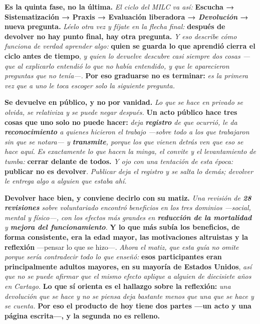\documentclass[11pt,letterpaper]{article}
\newcommand{\milcpaso}[3]{%
\Needspace{4\baselineskip}%
\begin{tcolorbox}[enhanced,colback=white,colframe=milcLinea,arc=1.5mm,boxrule=.9pt,
  left=14mm,right=4mm,top=3mm,bottom=3mm,before skip=4pt,after skip=4pt,
  fontupper=\RaggedRight,
  overlay={\node[anchor=north west,circle,fill=#2,text=white,inner sep=0pt,
    minimum size=7.4mm,font=\sffamily\bfseries\small]
    at ([xshift=3.6mm,yshift=-3.2mm]frame.north west) {#1};}]
#3
\end{tcolorbox}}
\begin{document}
\milcpaso{1}{milcTurquesa}{\textbf{Es la quinta fase, no la última.} \emph{El ciclo del MILC va así:} \textbf{Escucha → Sistematización → Praxis → Evaluación liberadora → \emph{Devolución} → nueva pregunta.} \emph{Léelo otra vez y fíjate en la flecha final:} \textbf{después de devolver no hay punto final, hay otra pregunta.} \emph{Y eso describe cómo funciona de verdad aprender algo:} \textbf{quien se guarda lo que aprendió cierra el ciclo antes de tiempo}, \emph{y quien lo devuelve descubre casi siempre dos cosas ---que al explicarlo entendió lo que no había entendido, y que le aparecieron preguntas que no tenía---.} \textbf{Por eso graduarse no es terminar:} \emph{es la primera vez que a uno le toca escoger solo la siguiente pregunta.}}
\milcpaso{2}{milcTurquesa}{\textbf{Se devuelve en público, y no por vanidad.} \emph{Lo que se hace en privado se olvida, se relativiza y se puede negar después.} \textbf{Un acto público hace tres cosas que uno solo no puede hacer:} \emph{deja \textbf{registro} de que ocurrió, le da \textbf{reconocimiento} a quienes hicieron el trabajo ---sobre todo a los que trabajaron sin que se notara--- y \textbf{transmite}, porque los que vienen detrás ven que eso se hace aquí}. \emph{Es exactamente lo que hacen la minga, el convite y el levantamiento de tumba:} \textbf{cerrar delante de todos.} \emph{Y ojo con una tentación de esta época:} \textbf{publicar no es devolver}. \emph{Publicar deja el registro y se salta lo demás; devolver le entrega algo a alguien que estaba ahí.}}
\milcpaso{3}{milcTurquesa}{\textbf{Devolver hace bien, y conviene decirlo con su matiz.} \emph{Una revisión de \textbf{28 revisiones} sobre voluntariado encontró beneficios en los tres dominios ---social, mental y físico---, con los efectos más grandes en \textbf{reducción de la mortalidad} y \textbf{mejora del funcionamiento}.} \textbf{Y lo que más subía los beneficios, de forma consistente, era la edad mayor, las motivaciones altruistas y \textbf{la reflexión}} ---pensar lo que se hizo---. \emph{Ahora el matiz, que esta guía no omite porque sería contradecir todo lo que enseñó:} \textbf{esos participantes eran principalmente adultos mayores, en su mayoría de Estados Unidos}, \emph{así que no se puede afirmar que el mismo efecto aplique a alguien de diecisiete años en Cartago.} \textbf{Lo que sí orienta es el hallazgo sobre la reflexión:} \emph{una devolución que se hace y no se piensa deja bastante menos que una que se hace y se cuenta.} \textbf{Por eso el producto de hoy tiene dos partes ---un acto y una página escrita---, y la segunda no es relleno.}}
\end{document}

